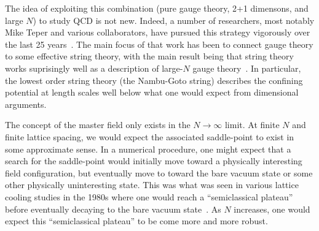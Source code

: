 \documentclass[preprint,aps,prd]{revtex4-2}
\DeclareMathOperator{\SU}{SU}
\begin{document}
%
The idea of exploiting this combination (pure gauge theory, 2+1 dimensons,
and large $N$) to study QCD  is not new.  Indeed, a number of
researchers, most notably Mike Teper and various collaborators,
have pursued this strategy vigorously over the last 25
years~\cite[Section~5.2]{lucini_sun_2013}.
The main focus of that work has been to connect gauge
theory to some effective string theory, with the main result being
that string theory works suprisingly well
as a description of large-$N$ gauge theory~\cite{brandt_effective_2016}.
In particular, the lowest
order string theory (the Nambu-Goto string) describes the confining
potential at length scales well below what one would expect
from dimensional arguments.

The concept of the master field only exists in the $N\to \infty$
limit.  At finite $N$ and finite lattice spacing, we would expect the associated
saddle-point to exist in some approximate sense.  In a numerical
procedure, one might expect that a search for the saddle-point
would initially move toward a physically interesting field
configuration, but eventually move to toward the bare vacuum state
or some other physically uninteresting state.  This was what was seen
in various lattice cooling studies in the 1980s where one
would reach a ``semiclassical plateau'' before eventually
decaying to the bare vacuum state~\cite{campostrini_cooling_1989,teper_cooling_1994}.  As $N$ increases, one would expect this ``semiclassical plateau''
to be come more and more robust.
\end{document}
